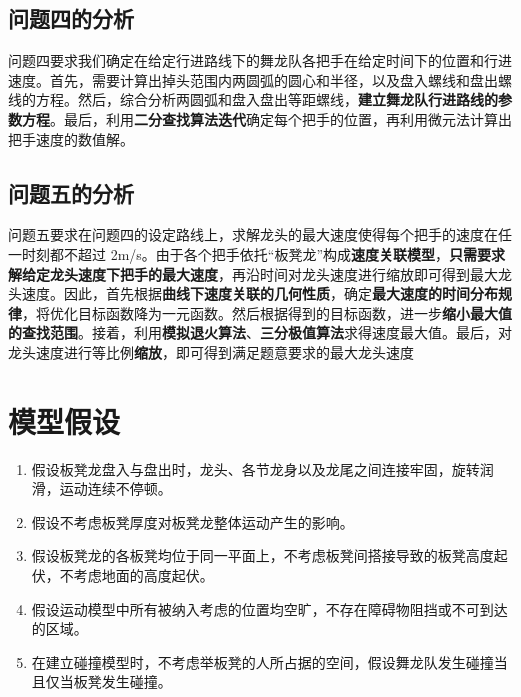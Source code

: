\documentclass[a4paper]{article}
\begin{document}
	\subsection{问题四的分析}
		问题四要求我们确定在给定行进路线下的舞龙队各把手在给定时间下的位置和行进速度。首先，需要计算出掉头范围内两圆弧的圆心和半径，以及盘入螺线和盘出螺线的方程。然后，综合分析两圆弧和盘入盘出等距螺线，\textbf{建立舞龙队行进路线的参数方程}。最后，利用\textbf{二分查找算法迭代}确定每个把手的位置，再利用微元法计算出把手速度的数值解。
	\subsection{问题五的分析}
		问题五要求在问题四的设定路线上，求解龙头的最大速度使得每个把手的速度在任一时刻都不超过 2m/s。由于各个把手依托“板凳龙”构成\textbf{速度关联模型}，\textbf{只需要求解给定龙头速度下把手的最大速度}，再沿时间对龙头速度进行缩放即可得到最大龙头速度。因此，首先根据\textbf{曲线下速度关联的几何性质}，确定\textbf{最大速度的时间分布规律}，将优化目标函数降为一元函数。然后根据得到的目标函数，进一步\textbf{缩小最大值的查找范围}。接着，利用\textbf{模拟退火算法}、\textbf{三分极值算法}求得速度最大值。最后，对龙头速度进行等比例\textbf{缩放}，即可得到满足题意要求的最大龙头速度

	\section{模型假设}
	\begin{enumerate}
		\item 假设板凳龙盘入与盘出时，龙头、各节龙身以及龙尾之间连接牢固，旋转润滑，运动连续不停顿。
		\item 假设不考虑板凳厚度对板凳龙整体运动产生的影响。
		\item 假设板凳龙的各板凳均位于同一平面上，不考虑板凳间搭接导致的板凳高度起伏，不考虑地面的高度起伏。
        \item 假设运动模型中所有被纳入考虑的位置均空旷，不存在障碍物阻挡或不可到达的区域。
        \item 在建立碰撞模型时，不考虑举板凳的人所占据的空间，假设舞龙队发生碰撞当且仅当板凳发生碰撞。
	\end{enumerate}

\end{document}

